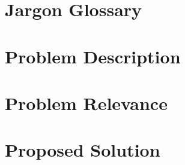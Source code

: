 \documentclass[a4paper]{article}
\begin{document}
    

    \begin{normalsize}
    
        \section{Jargon Glossary}
        
		
		\section{Problem Description}
        
                
        \section{Problem Relevance}
        

        \section{Proposed Solution}
        
	   	
        

    \end{normalsize}
    
    
    
\end{document}
